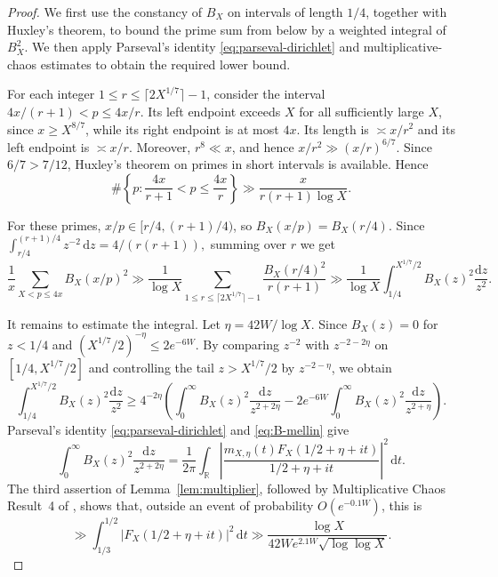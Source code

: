 \documentclass[a4paper,12pt,reqno]{amsart}
\numberwithin{equation}{section}
\theoremstyle{remark}
\newcommand{\R}{\mathbb{R}}
\begin{document}
\begin{proof}
 We first use the constancy of $B_X$ on
intervals of length $1/4$, together with Huxley's theorem, to bound the
prime sum from below by a weighted integral of $B_X^2$. We then apply
Parseval's identity \eqref{eq:parseval-dirichlet} and multiplicative-chaos estimates to obtain the
required lower bound.

For each integer $1\leq r\leq\lceil2X^{1/7}\rceil-1$, consider the
interval
\(
 4x/(r+1)<p\leq4x/r.
\)
Its left endpoint exceeds $X$ for all sufficiently large $X$, since
$x\geq X^{8/7}$, while its right endpoint is at most $4x$. Its length is
$\asymp x/r^2$ and its left endpoint is $\asymp x/r$. Moreover,
$r^8\ll x$, and hence
\(
 x/r^2\gg(x/r)^{6/7}.
\)
Since $6/7>7/12$, Huxley's theorem on primes in short intervals
\cite[Theorem~1]{Huxley1972} is available. Hence
\[
 \#\left\{p:\frac{4x}{r+1}<p\leq\frac{4x}{r}\right\}
 \gg\frac{x}{r(r+1)\log X}.
\]


For these primes, $x/p\in[r/4,(r+1)/4)$, so
$B_X(x/p)=B_X(r/4)$. Since
\(
 \int_{r/4}^{(r+1)/4}z^{-2}\,\mathrm{d}z=4/(r(r+1)),
\)
summing over $r$ we get
\[
 \frac1x\sum_{X<p\leq4x}B_X(x/p)^2
 \gg\frac1{\log X}
 \sum_{1\leq r\leq\lceil2X^{1/7}\rceil-1}
 \frac{B_X(r/4)^2}{r(r+1)}
 \gg\frac1{\log X}
 \int_{1/4}^{X^{1/7}/2}B_X(z)^2\frac{\mathrm{d}z}{z^2}.
\]

It remains to estimate the integral. Let $\eta=42W/\log X$. Since
$B_X(z)=0$ for $z<1/4$ and
$(X^{1/7}/2)^{-\eta}\leq2e^{-6W}$. By comparing $z^{-2}$ with $z^{-2-2\eta}$ on
$[1/4,X^{1/7}/2]$ and controlling the tail $z>X^{1/7}/2$ by
$z^{-2-\eta}$, we obtain
\[
\int_{1/4}^{X^{1/7}/2}B_X(z)^2\frac{\mathrm{d}z}{z^2}
 \geq4^{-2\eta}\left(
 \int_0^\infty B_X(z)^2\frac{\mathrm{d}z}{z^{2+2\eta}}
 -2e^{-6W}\int_0^\infty B_X(z)^2
 \frac{\mathrm{d}z}{z^{2+\eta}}
 \right).
\]
Parseval's identity \eqref{eq:parseval-dirichlet} and \eqref{eq:B-mellin} give
\begin{equation}\label{eq:B-main-parseval}
 \int_0^\infty B_X(z)^2\frac{\mathrm{d}z}{z^{2+2\eta}}
 =
 \frac1{2\pi}\int_{\R}
 \left|
 \frac{m_{X,\eta}(t)F_X(1/2+\eta+it)}
 {1/2+\eta+it}
 \right|^2\,\mathrm{d}t.
\end{equation}
The third assertion of Lemma~\ref{lem:multiplier}, followed by
Multiplicative Chaos Result~4 of
\cite[Section~2.4]{Harper2023Large}, shows that, outside an event of
probability $O(e^{-0.1W})$, this is
\[
 \gg\int_{1/3}^{1/2}|F_X(1/2+\eta+it)|^2\,\mathrm{d}t
 \gg\frac{\log X}
 {42W e^{2.1W}\sqrt{\log\log X}}.
\]


\end{proof}
\end{document}
